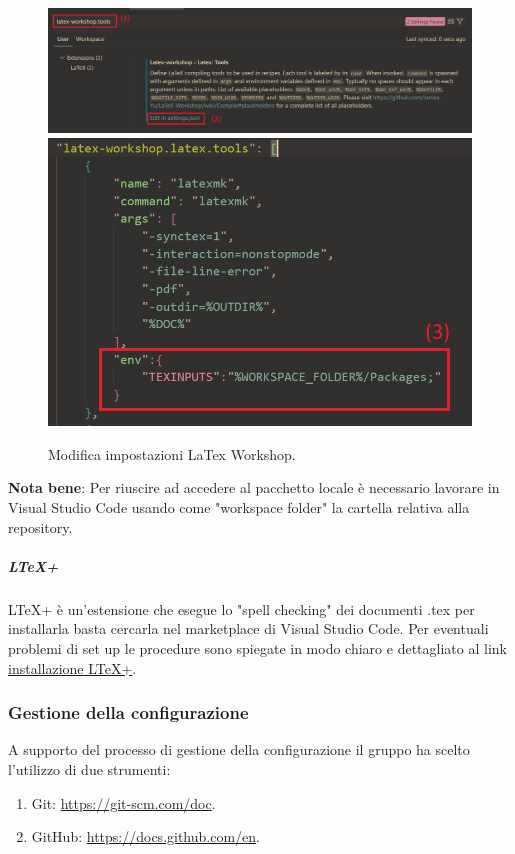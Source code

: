 \begin{figure}[H]
    \center
    \includegraphics[scale=0.4]{Sezioni/ProcessiDiSupporto/Immagini/texinputs_setup.png}
    \includegraphics[]{Sezioni/ProcessiDiSupporto/Immagini/texinputs_setup_json.jpg}
    \caption{Modifica impostazioni LaTex Workshop.}
    \label{fig:texinputs}
\end{figure}
\textbf{Nota bene}: Per riuscire ad accedere al pacchetto locale è necessario lavorare in Visual Studio Code usando come "workspace folder" la cartella relativa alla repository.

\subparagraph{LTeX+}
LTeX+ è un'estensione che esegue lo "spell checking" dei documenti .tex per installarla basta cercarla nel marketplace di Visual Studio Code.
Per eventuali problemi di set up le procedure sono spiegate in modo chiaro e dettagliato al link \href{https://ltex-plus.github.io/ltex-plus/vscode-ltex-plus/setting-scopes-files.html}{installazione LTeX+}.

\subsubsection{Gestione della configurazione}
A supporto del processo di gestione della configurazione il gruppo ha scelto l'utilizzo di due strumenti:
\begin{enumerate}
    \item Git: \href{https://git-scm.com/doc}{https://git-scm.com/doc}.
    \item GitHub: \href{https://docs.github.com/en}{https://docs.github.com/en}.
\end{enumerate}

